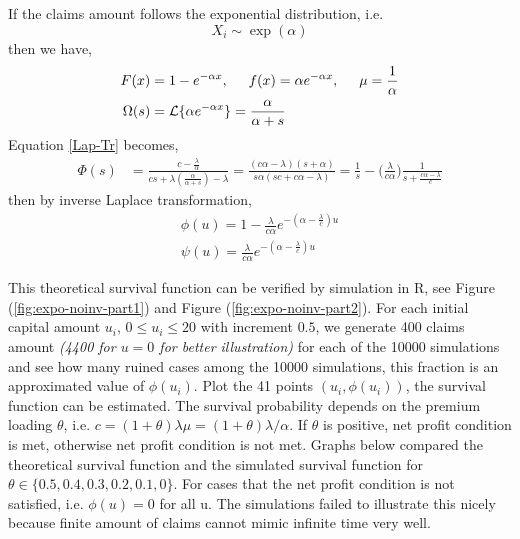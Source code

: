 \documentclass[12pt]{article}
\begin{document}
If the claims amount follows the exponential distribution, i.e. 
\[X_i\sim \exp(\alpha)\]
then we have,
\begin{align*}
 F(x)&=1-e^{-\alpha x},
 \hspace{0.5cm}
 f(x)=\alpha e^{-\alpha x},
 \hspace{0.5cm}
 \mu=\frac{1}{\alpha}\\
 \Omega(s)&=\mathcal{L}\{\alpha e^{-\alpha x}\}=\frac{\alpha}{\alpha+s}
\end{align*}
Equation \eqref{Lap-Tr} becomes,
\begin{align*}
\Phi(s)&=\frac{c-\frac{\lambda}{\alpha}}{cs+\lambda(\frac{\alpha}{\alpha+s})-\lambda}=\frac{(c\alpha-\lambda)(s+\alpha)}{s\alpha(sc+c\alpha-\lambda)}=\frac{1}{s}-\Big(\frac{\lambda}{c\alpha}\Big)\frac{1}{s+\frac{c\alpha-\lambda}{c}}
\end{align*}
then by inverse Laplace transformation,
\begin{eqnarray}
\phi(u)=1-\frac{\lambda}{c\alpha}e^{-(\alpha-\frac{\lambda}{c})u}\label{hahaha}\label{exp_noinv_surv}\\
\psi(u)=\frac{\lambda}{c\alpha}e^{-(\alpha-\frac{\lambda}{c})u}\label{exp_noinv_ruin}
\end{eqnarray}

This theoretical survival function can be verified by simulation in R\cite{ref03}, see Figure (\ref{fig:expo-noinv-part1}) and Figure (\ref{fig:expo-noinv-part2}). For each initial capital amount \(u_i\), \(0\leq u_i\leq 20\) with increment \(0.5\), we generate 400 claims amount \textit{(4400 for \(u=0\) for better illustration)} for each of the 10000 simulations and see how many ruined cases among the 10000 simulations, this fraction is an approximated value of \(\phi(u_i)\). Plot the 41 points \((u_i,\phi(u_i))\), the survival function can be estimated. The survival probability depends on the premium loading \(\theta\), i.e. \(c=(1+\theta)\lambda\mu=(1+\theta)\lambda/\alpha\). If \(\theta\) is positive, net profit condition is met, otherwise net profit condition is not met. Graphs below compared the theoretical survival function and the simulated survival function for \(\theta\in\{0.5,0.4,0.3,0.2,0.1,0\}\). For cases that the net profit condition is not satisfied, i.e. \(\phi(u)=0\) for all u. The simulations failed to illustrate this nicely because finite amount of claims cannot mimic infinite time very well.
\end{document}
